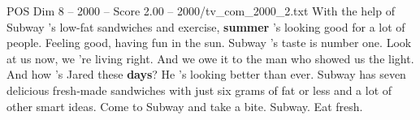 \begin{textsample}{POS Dim 8 – 2000 – Score 2.00 – 2000/tv\_com\_2000\_2.txt}  \label{ex:f8_pos_031}
With the help of Subway 's low-fat sandwiches and exercise, \textbf{summer} 's looking good for a lot of people.
Feeling good, having fun in the sun.
Subway 's taste is number one.
Look at us now, we 're living right.
And we owe it to the man who showed us the light.
And how 's Jared these \textbf{days}?
He 's looking better than ever.
Subway has seven delicious fresh-made sandwiches with just six grams of fat or less and a lot of other smart ideas.
Come to Subway and take a bite.
Subway.
Eat fresh.

\end{textsample}
